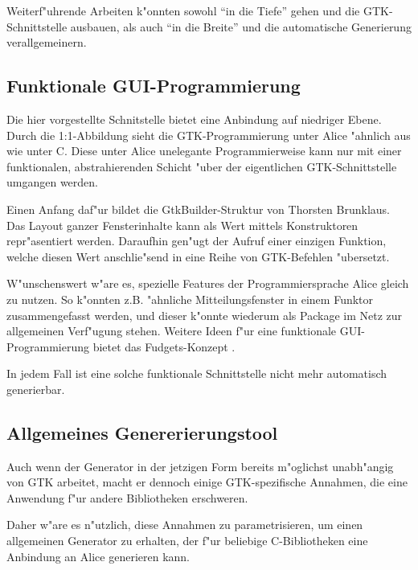 \documentclass[a4paper,titlepage]{article}
\begin{document}
Weiterf"uhrende Arbeiten k"onnten sowohl ``in die Tiefe'' gehen und die
GTK-Schnittstelle ausbauen, als auch ``in die Breite'' und die automatische
Generierung verallgemeinern.

\subsection*{Funktionale GUI-Programmierung}

Die hier vorgestellte Schnitstelle bietet eine Anbindung auf niedriger Ebene.
Durch die 1:1-Abbildung sieht die GTK-Programmierung unter Alice "ahnlich
aus wie unter C. Diese unter Alice unelegante Programmierweise kann
nur mit einer funktionalen, abstrahierenden Schicht "uber der
eigentlichen GTK-Schnittstelle umgangen werden.

Einen Anfang daf"ur bildet die GtkBuilder-Struktur von Thorsten Brunklaus.
Das Layout ganzer Fensterinhalte kann als Wert mittels Konstruktoren
repr"asentiert werden. Daraufhin gen"ugt der Aufruf einer einzigen Funktion,
welche diesen Wert anschlie"send in eine Reihe von GTK-Befehlen "ubersetzt.

W"unschenswert w"are es, spezielle Features der Programmiersprache Alice
gleich zu nutzen. So k"onnten z.B. "ahnliche Mitteilungsfenster
in einem Funktor zusammengefasst werden, und dieser k"onnte wiederum als
Package im Netz zur allgemeinen Verf"ugung stehen. Weitere Ideen
f"ur eine funktionale GUI-Programmierung bietet das Fudgets-Konzept
\cite{fudgets}. 

In jedem Fall ist eine solche funktionale Schnittstelle
nicht mehr automatisch generierbar.

\subsection*{Allgemeines Genererierungstool}

Auch wenn der Generator in der jetzigen Form bereits m"oglichst unabh"angig
von GTK arbeitet, macht er dennoch einige GTK-spezifische Annahmen, die
eine Anwendung f"ur andere Bibliotheken erschweren.

Daher w"are es n"utzlich, diese Annahmen zu parametrisieren, um einen
allgemeinen Generator zu erhalten, der f"ur beliebige C-Bibliotheken
eine Anbindung an Alice generieren kann.
\end{document}
